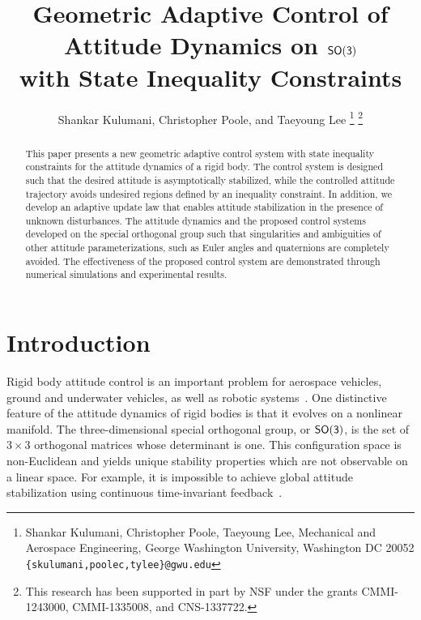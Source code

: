 \documentclass[letterpaper, 10 pt, conference]{ieeeconf}  %
\title{\LARGE \bf
Geometric Adaptive Control of Attitude Dynamics on $\mathsf{SO(3)}$\\ with State Inequality Constraints}
\author{Shankar Kulumani, Christopher Poole, and Taeyoung Lee
\thanks{Shankar Kulumani, Christopher Poole, Taeyoung Lee, Mechanical and Aerospace Engineering, George Washington University, Washington DC 20052 {\tt \{skulumani,poolec,tylee\}@gwu.edu}}
\thanks{This research has been supported in part by NSF under the grants CMMI-1243000, CMMI-1335008, and CNS-1337722.}
}
\begin{document}
\allowdisplaybreaks

\maketitle
\thispagestyle{empty}
\pagestyle{empty}


\begin{abstract}
This paper presents a new geometric adaptive control system with state inequality constraints for the attitude dynamics of a rigid body. The control system is designed such that the desired attitude is asymptotically stabilized, while the controlled attitude trajectory avoids undesired regions defined by an inequality constraint. In addition, we develop an adaptive update law that enables attitude stabilization in the presence of unknown disturbances. The attitude dynamics and the proposed control systems developed on the special orthogonal group such that singularities and ambiguities of other attitude parameterizations, such as Euler angles and quaternions are completely avoided. The effectiveness of the proposed control system are demonstrated through numerical simulations and experimental results.
\end{abstract}


\section{Introduction}\label{sec:intro}

Rigid body attitude control is an important problem for aerospace vehicles, ground and underwater vehicles, as well as robotic systems~\cite{hughes2004,wertz1978}.
One distinctive feature of the attitude dynamics of rigid bodies is that it evolves on a nonlinear manifold.
The three-dimensional special orthogonal group, or \( \mathsf{SO(3)} \), is the set of \( 3 \times 3 \) orthogonal matrices whose determinant is one.
This configuration space is non-Euclidean and yields unique stability properties which are not observable on a linear space.
For example, it is impossible to achieve global attitude stabilization using continuous time-invariant feedback~\cite{bhat2000}.


\end{document}
